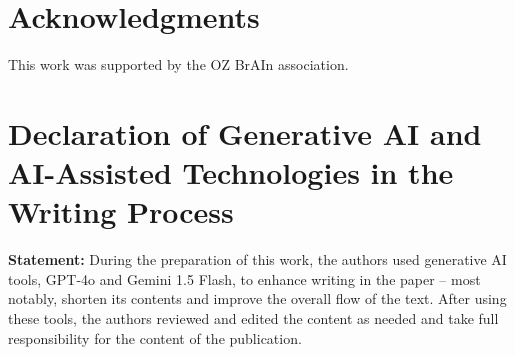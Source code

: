 
\section*{Acknowledgments}

\noindent This work was supported by the OZ BrAIn association.

\section*{Declaration of Generative AI and AI-Assisted Technologies in the Writing Process}

\noindent \textbf{Statement:} During the preparation of this work, the authors used generative AI tools, GPT-4o and Gemini 1.5 Flash, to enhance writing in the paper -- most notably, shorten its contents and improve the overall flow of the text. After using these tools, the authors reviewed and edited the content as needed and take full responsibility for the content of the publication.
